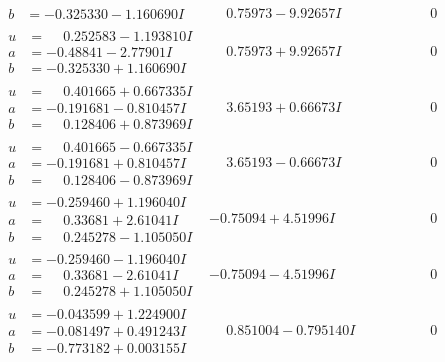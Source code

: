 \documentclass[1p]{elsarticle_modified}
\theoremstyle{definition}
\begin{document}
$$\begin{array}{c|c|c}
\begin{aligned}
b &= -0.325330 - 1.160690 I\end{aligned}
 & \phantom{-}0.75973 - 9.92657 I & \phantom{-0.000000 } 0 \\ \hline\begin{aligned}
u &= \phantom{-}0.252583 - 1.193810 I \\
a &= -0.48841 - 2.77901 I \\
b &= -0.325330 + 1.160690 I\end{aligned}
 & \phantom{-}0.75973 + 9.92657 I & \phantom{-0.000000 } 0 \\ \hline\begin{aligned}
u &= \phantom{-}0.401665 + 0.667335 I \\
a &= -0.191681 - 0.810457 I \\
b &= \phantom{-}0.128406 + 0.873969 I\end{aligned}
 & \phantom{-}3.65193 + 0.66673 I & \phantom{-0.000000 } 0 \\ \hline\begin{aligned}
u &= \phantom{-}0.401665 - 0.667335 I \\
a &= -0.191681 + 0.810457 I \\
b &= \phantom{-}0.128406 - 0.873969 I\end{aligned}
 & \phantom{-}3.65193 - 0.66673 I & \phantom{-0.000000 } 0 \\ \hline\begin{aligned}
u &= -0.259460 + 1.196040 I \\
a &= \phantom{-}0.33681 + 2.61041 I \\
b &= \phantom{-}0.245278 - 1.105050 I\end{aligned}
 & -0.75094 + 4.51996 I & \phantom{-0.000000 } 0 \\ \hline\begin{aligned}
u &= -0.259460 - 1.196040 I \\
a &= \phantom{-}0.33681 - 2.61041 I \\
b &= \phantom{-}0.245278 + 1.105050 I\end{aligned}
 & -0.75094 - 4.51996 I & \phantom{-0.000000 } 0 \\ \hline\begin{aligned}
u &= -0.043599 + 1.224900 I \\
a &= -0.081497 + 0.491243 I \\
b &= -0.773182 + 0.003155 I\end{aligned}
 & \phantom{-}0.851004 - 0.795140 I & \phantom{-0.000000 } 0 \\ \hline\begin{aligned}

\end{aligned}
\end{array}$$
\end{document}
